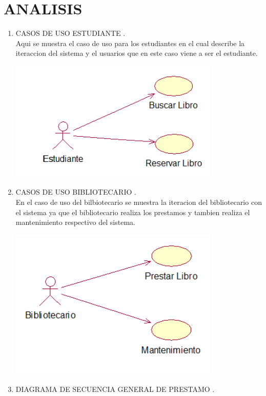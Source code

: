 \section{ANALISIS} 

\begin{enumerate}[1.]
	\item CASOS DE USO ESTUDIANTE .\\
		Aqui se muestra el caso de uso para los estudiantes en el cual describe la iteraccion del sistema y el usuarios que en 			este caso viene a ser el estudiante.
	\begin{center}
	
	\includegraphics[width=10cm]{./Imagenes/img1} 
	\end{center}
	\item CASOS DE USO BIBLIOTECARIO .\\
		En el caso de uso del bilbiotecario se muestra la iteracion del bibliotecario con el sistema ya que el bibliotecario 	realiza los prestamos y tambien realiza el mantenimiento respectivo del sistema.
	\begin{center}
	\includegraphics[width=10cm]{./Imagenes/img2} 
	\end{center}
\newpage
   	 \item DIAGRAMA DE SECUENCIA GENERAL DE PRESTAMO .\\

\end{enumerate}
